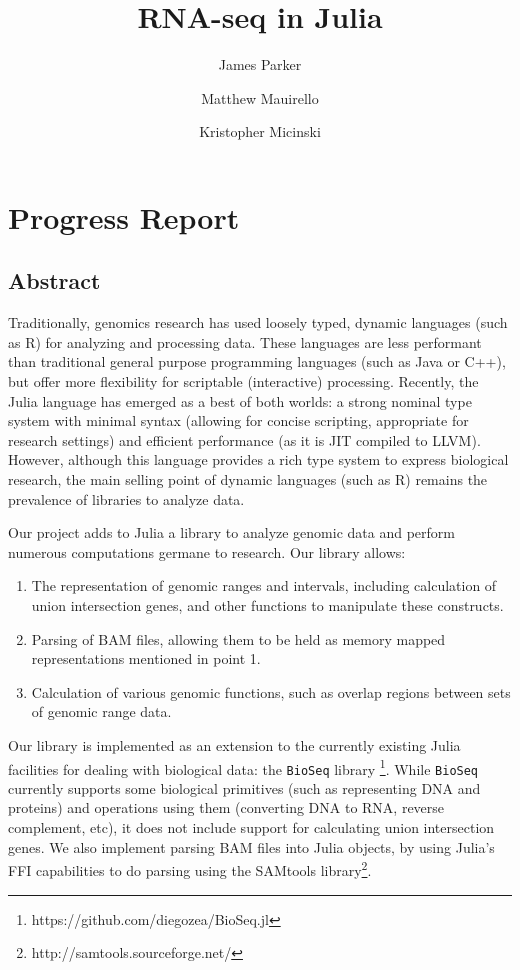 \documentclass[10pt]{article}
\title{RNA-seq in Julia}
\author{James Parker}
\author{Matthew Mauirello}
\author{Kristopher Micinski}
\begin{document}
\maketitle

\section{Progress Report}

\subsection{Abstract}

Traditionally, genomics research has used loosely typed, dynamic languages 
(such as R) for analyzing and processing data.  These languages are less 
performant than traditional general purpose programming languages (such as Java or C++), 
but offer more flexibility for scriptable (interactive) processing.   Recently, the Julia language 
has emerged as a best of both worlds: a strong nominal type system with minimal syntax 
(allowing for concise scripting, appropriate for research settings) and efficient performance (as it is JIT 
compiled to LLVM).  However, although this language provides a rich type system to express 
biological research, the main selling point of dynamic languages (such as R) remains the prevalence 
of libraries to analyze data.

Our project adds to Julia a library to analyze genomic data and perform numerous computations 
germane to research. Our library allows:

\begin{enumerate}
\item The representation of genomic ranges and intervals, including calculation of 
union intersection genes, and other functions to manipulate these constructs.
\item Parsing of BAM files, allowing them to be held as memory mapped representations 
mentioned in point 1.
\item Calculation of various genomic functions, such as overlap regions between sets of 
genomic range data.
\end{enumerate}

Our library is implemented as an extension to the currently existing Julia facilities for 
dealing with biological data: the \texttt{BioSeq} library \footnote{https://github.com/diegozea/BioSeq.jl}.  
While \texttt{BioSeq} currently supports some biological primitives (such as representing DNA and proteins) 
and operations using them (converting DNA to RNA, reverse complement, etc), it 
does not include support for calculating union intersection genes.  We also implement 
parsing BAM files into Julia objects, by using Julia's FFI capabilities to do parsing using the 
SAMtools library\footnote{http://samtools.sourceforge.net/}.
\end{document}
